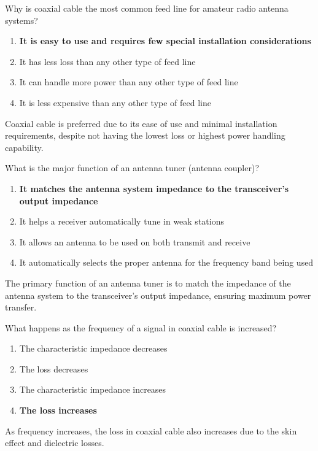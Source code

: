 
\begin{tcolorbox}[colback=gray!10!white,colframe=black!75!black,title={T9B03}]
    Why is coaxial cable the most common feed line for amateur radio antenna systems?
    \begin{enumerate}[label=\Alph*,noitemsep]
        \item \textbf{It is easy to use and requires few special installation considerations}
        \item It has less loss than any other type of feed line
        \item It can handle more power than any other type of feed line
        \item It is less expensive than any other type of feed line
    \end{enumerate}
\end{tcolorbox}
Coaxial cable is preferred due to its ease of use and minimal installation requirements, despite not having the lowest loss or highest power handling capability.


\begin{tcolorbox}[colback=gray!10!white,colframe=black!75!black,title={T9B04}]
    What is the major function of an antenna tuner (antenna coupler)?
    \begin{enumerate}[label=\Alph*,noitemsep]
        \item \textbf{It matches the antenna system impedance to the transceiver's output impedance}
        \item It helps a receiver automatically tune in weak stations
        \item It allows an antenna to be used on both transmit and receive
        \item It automatically selects the proper antenna for the frequency band being used
    \end{enumerate}
\end{tcolorbox}
The primary function of an antenna tuner is to match the impedance of the antenna system to the transceiver's output impedance, ensuring maximum power transfer.


\begin{tcolorbox}[colback=gray!10!white,colframe=black!75!black,title={T9B05}]
    What happens as the frequency of a signal in coaxial cable is increased?
    \begin{enumerate}[label=\Alph*,noitemsep]
        \item The characteristic impedance decreases
        \item The loss decreases
        \item The characteristic impedance increases
        \item \textbf{The loss increases}
    \end{enumerate}
\end{tcolorbox}
As frequency increases, the loss in coaxial cable also increases due to the skin effect and dielectric losses.

